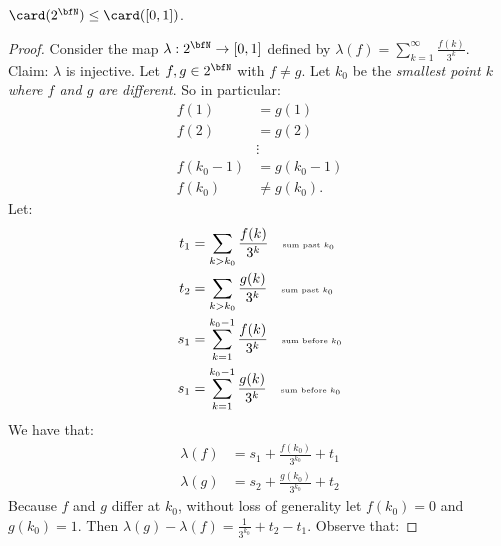     \begin{lemma}\label{lemma:3}
        $\card(2^\bfN) \leq \card([0,1])$.
    \end{lemma}
        \begin{proof}
            Consider the map $\lambda:2^\bfN \rightarrow [0,1]$ defined by $\lambda(f) = \sum_{k = 1}^\infty  \frac{f(k)}{3^k}$. Claim: $\lambda$ is injective. Let $f,g \in 2^\bfN$ with $f\neq g$. Let $k_0$ be the \textit{smallest point $k$ where $f$ and $g$ are different}. So in particular:
                \begin{equation*}
                \begin{split}
                    f(1) &= g(1) \\
                    f(2) & = g(2) \\
                    &\vdots \\
                    f(k_0 - 1) &= g(k_0 - 1) \\
                    f(k_0) &\neq g(k_0).
                \end{split}
                \end{equation*}
            Let:
                \begin{equation*}
                \begin{split}
                    t_1 &= \sum_{k > k_0} \frac{f(k)}{3^k} \quad {\text{\tiny sum past $k_0$}}\\
                    t_2 &= \sum_{k > k_0} \frac{g(k)}{3^k} \quad {\text{\tiny sum past $k_0$}}\\
                    s_1 &= \sum_{k = 1}^{k_0 - 1} \frac{f(k)}{3^k} \quad {\text{\tiny sum before $k_0$}}\\
                    s_1 &= \sum_{k = 1}^{k_0 - 1} \frac{g(k)}{3^k} \quad {\text{\tiny sum before $k_0$}}
                \end{split}
                \end{equation*}
            We have that:
                \begin{equation*}
                \begin{split}
                    \lambda(f) &= s_1 + \frac{f(k_0)}{3^{k_0}} + t_1 \\
                    \lambda(g) &= s_2 + \frac{g(k_0)}{3^{k_0}} + t_2
                \end{split}
                \end{equation*}
            Because $f$ and $g$ differ at $k_0$, without loss of generality let $f(k_0) = 0$ and $g(k_0) = 1$. Then $\lambda(g) - \lambda(f) = \frac{1}{3^{k_0}} + t_2 - t_1$. Observe that:

\end{proof}
